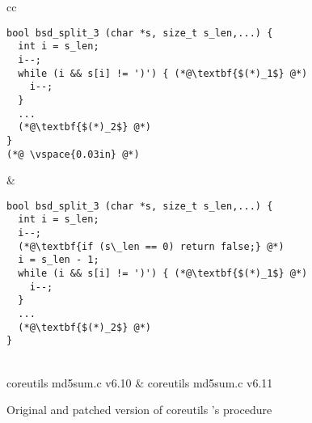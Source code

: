 \begin{figure*}
\centering
\begin{tabular}{cc}
\begin{lstlisting}
bool bsd_split_3 (char *s, size_t s_len,...) {
  int i = s_len;
  i--;
  while (i && s[i] != ')') { (*@\textbf{$(*)_1$} @*)
    i--;
  }
  ...
  (*@\textbf{$(*)_2$} @*)
}
(*@ \vspace{0.03in} @*)
\end{lstlisting}
&
\begin{lstlisting}
bool bsd_split_3 (char *s, size_t s_len,...) {
  int i = s_len;
  i--;
  (*@\textbf{if (s\_len == 0) return false;} @*)
  i = s_len - 1;
  while (i && s[i] != ')') { (*@\textbf{$(*)_1$} @*)
    i--;
  }
  ...
  (*@\textbf{$(*)_2$} @*)
}
\end{lstlisting}
\\
coreutils md5sum.c v6.10 & coreutils md5sum.c v6.11
\end{tabular}
\caption{Original and patched version of coreutils 's  procedure}
\end{figure*}